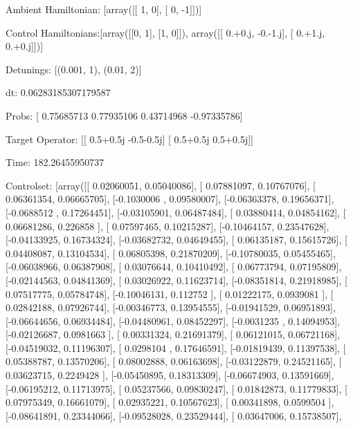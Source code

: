 \documentclass{article}
\begin{document}
    

\newpage

Ambient Hamiltonian: [array([[ 1,  0],
       [ 0, -1]])]

Control Hamiltonians:[array([[0, 1],
       [1, 0]]), array([[ 0.+0.j, -0.-1.j],
       [ 0.+1.j,  0.+0.j]])]

Detunings: [(0.001, 1), (0.01, 2)]

 dt: 0.06283185307179587

Probs: [ 0.75685713  0.77935106  0.43714968 -0.97335786]

Target Operator: [[ 0.5+0.5j -0.5-0.5j]
 [ 0.5+0.5j  0.5+0.5j]]

Time: 182.26455950737

Controlset: [array([[ 0.02060051,  0.05040086],
       [ 0.07881097,  0.10767076],
       [ 0.06361354,  0.06665705],
       [-0.1030006 ,  0.09580007],
       [-0.06363378,  0.19656371],
       [-0.0688512 ,  0.17264451],
       [-0.03105901,  0.06487484],
       [ 0.03880414,  0.04854162],
       [ 0.06681286,  0.226858  ],
       [ 0.07597465,  0.10215287],
       [-0.10464157,  0.23547628],
       [-0.04133925,  0.16734324],
       [-0.03682732,  0.04649455],
       [ 0.06135187,  0.15615726],
       [ 0.04408087,  0.13104534],
       [ 0.06805398,  0.21870209],
       [-0.10780035,  0.05455465],
       [-0.06038966,  0.06387908],
       [ 0.03076644,  0.10410492],
       [ 0.06773794,  0.07195809],
       [-0.02144563,  0.04841369],
       [ 0.03026922,  0.11623714],
       [-0.08351814,  0.21918985],
       [ 0.07517775,  0.05784748],
       [-0.10046131,  0.112752  ],
       [ 0.01222175,  0.0939081 ],
       [ 0.02842188,  0.07926744],
       [-0.00346773,  0.13954555],
       [-0.01941529,  0.06951893],
       [-0.06644656,  0.06934484],
       [-0.04480961,  0.08452297],
       [-0.0031235 ,  0.14094953],
       [-0.02126687,  0.0981663 ],
       [ 0.00331324,  0.21691379],
       [ 0.06121015,  0.06721168],
       [-0.04519032,  0.11196307],
       [ 0.0298104 ,  0.17646591],
       [-0.01819439,  0.11397538],
       [ 0.05388787,  0.13570206],
       [ 0.08002888,  0.06163698],
       [-0.03122879,  0.24521165],
       [ 0.03623715,  0.2249428 ],
       [-0.05450895,  0.18313309],
       [-0.06674903,  0.13591669],
       [-0.06195212,  0.11713975],
       [ 0.05237566,  0.09830247],
       [ 0.01842873,  0.11779833],
       [ 0.07975349,  0.16661079],
       [ 0.02935221,  0.10567623],
       [ 0.00341898,  0.0599504 ],
       [-0.08641891,  0.23344066],
       [-0.09528028,  0.23529444],
       [ 0.03647006,  0.15738507],
\end{document}
